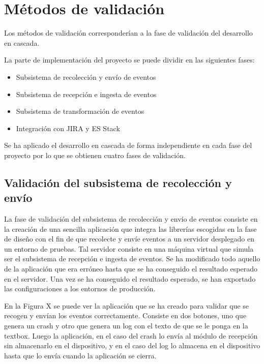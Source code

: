 \section{Métodos de validación}

Los métodos de validación corresponderían a la fase de validación del desarrollo en cascada.

La parte de implementación del proyecto se puede dividir en las siguientes fases:

\begin{itemize}
	\item Subsistema de recolección y envío de eventos
	\item Subsistema de recepción e ingesta de eventos
	\item Subsistema de transformación de eventos
	\item Integración con JIRA y ES Stack
\end{itemize}

Se ha aplicado el desarrollo en cascada de forma independiente en cada fase del proyecto por lo que se obtienen cuatro fases de validación.

\subsection{Validación del subsistema de recolección y envío}
La fase de validación del subsistema de recolección y envío de eventos consiste en la creación de una sencilla aplicación que integra las librerías escogidas en la fase de diseño con el fin de que recolecte y envíe eventos a un servidor desplegado en un entorno de pruebas. Tal servidor consiste en una máquina virtual que simula ser el subsistema de recepción e ingesta de eventos. Se ha modificado todo aquello de la aplicación que era erróneo hasta que se ha conseguido el resultado esperado en el servidor. Una vez se ha conseguido el resultado esperado, se han exportado las configuraciones a los entornos de producción.


En la Figura X se puede ver la aplicación que se ha creado para validar que se recogen y envían los eventos correctamente. Consiste en dos botones, uno que genera un crash y otro que genera un log con el texto de que se le ponga en la textbox. Luego la aplicación, en el caso del crash lo envía al módulo de recepción sin almacenarlo en el dispositivo, y en el caso del log lo almacena en el dispositivo hasta que lo envía cuando la aplicación se cierra.


